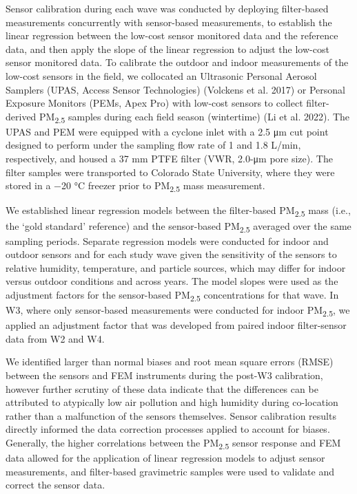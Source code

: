 \documentclass[
  letterpaper,
  DIV=11,
  numbers=noendperiod]{scrartcl}
\begin{document}
Sensor calibration during each wave was conducted by deploying
filter-based measurements concurrently with sensor-based measurements,
to establish the linear regression between the low-cost sensor monitored
data and the reference data, and then apply the slope of the linear
regression to adjust the low-cost sensor monitored data. To calibrate
the outdoor and indoor measurements of the low-cost sensors in the
field, we collocated an Ultrasonic Personal Aerosol Samplers (UPAS,
Access Sensor Technologies) (Volckens et al. 2017) or Personal Exposure
Monitors (PEMs, Apex Pro) with low-cost sensors to collect
filter-derived PM\textsubscript{2.5} samples during each field season
(wintertime) (Li et al. 2022). The UPAS and PEM were equipped with a
cyclone inlet with a 2.5 μm cut point designed to perform under the
sampling flow rate of 1 and 1.8 L/min, respectively, and housed a 37 mm
PTFE filter (VWR, 2.0-μm pore size). The filter samples were transported
to Colorado State University, where they were stored in a −20 °C freezer
prior to PM\textsubscript{2.5} mass measurement.

We established linear regression models between the filter-based
PM\textsubscript{2.5} mass (i.e., the `gold standard' reference) and the
sensor-based PM\textsubscript{2.5} averaged over the same sampling
periods. Separate regression models were conducted for indoor and
outdoor sensors and for each study wave given the sensitivity of the
sensors to relative humidity, temperature, and particle sources, which
may differ for indoor versus outdoor conditions and across years. The
model slopes were used as the adjustment factors for the sensor-based
PM\textsubscript{2.5} concentrations for that wave. In W3, where only
sensor-based measurements were conducted for indoor
PM\textsubscript{2.5}, we applied an adjustment factor that was
developed from paired indoor filter-sensor data from W2 and W4.

We  identified larger than normal biases and root mean
square errors (RMSE) between the sensors and FEM instruments during the
post-W3 calibration, however further scrutiny of these data indicate
that the differences can be attributed to atypically low air pollution
and high humidity during co-location rather than a malfunction of the
sensors themselves. Sensor calibration  results directly
informed the data correction processes applied to account for biases.
Generally, the higher correlations between the PM\textsubscript{2.5}
sensor response and FEM data allowed for the application of linear
regression models to adjust sensor measurements, and filter-based
gravimetric samples were used to validate and correct the sensor data.
\end{document}
